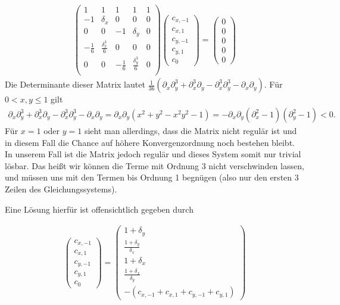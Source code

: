 \begin{solution}
  \begin{align*}
    \begin{pmatrix}
      1 & 1 & 1 & 1 & 1 \\
      -1 & \delta_x & 0 & 0 & 0 \\
      0 & 0 & -1 & \delta_y & 0 \\
      -\frac{1}{6} & \frac{\delta_x^3}{6} & 0 & 0 & 0 \\
      0 & 0 & -\frac{1}{6} & \frac{\delta_y^3}{6} & 0 \\
    \end{pmatrix}
    \begin{pmatrix}
      c_{x,-1} \\
      c_{x,1} \\
      c_{y,-1} \\
      c_{y,1} \\
      c_{0}
    \end{pmatrix} =
    \begin{pmatrix}
      0 \\ 0 \\ 0 \\ 0 \\ 0
    \end{pmatrix}
  \end{align*}
  Die Determinante dieser Matrix lautet
  $\frac{1}{36}(\partial_x\partial_y^3 + \partial_x^3\partial_y
  - \partial_x^3\partial_y^3 - \partial_x\partial_y)$.
  Für $0 < x,y \leq 1$ gilt
  \begin{align*}
    \partial_x\partial_y^3 + \partial_x^3\partial_y
    - \partial_x^3\partial_y^3 - \partial_x\partial_y =
    \partial_x\partial_y(x^2 + y^2 - x^2y^2 - 1) =
    -\partial_x\partial_y(\partial_x^2 - 1)(\partial_y^2 - 1) < 0.
  \end{align*}
  Für $x = 1$ oder $y = 1$ sieht man allerdings, dass die Matrix nicht regulär
  ist und in diesem Fall die Chance auf höhere Konvergenzordnung noch bestehen bleibt.
  In unserem Fall ist die Matrix jedoch regulär und dieses System somit nur trivial lösbar.
  Das heißt wir können die Terme mit Ordnung 3 nicht verschwinden lassen, und müssen uns mit den Termen bis Ordnung 1 begnügen (also nur den ersten 3 Zeilen des Gleichungssystems).

  Eine Lösung hierfür ist offensichtlich gegeben durch

  \begin{align*}
  \begin{pmatrix}
  c_{x,-1} \\
  c_{x,1} \\
  c_{y,-1} \\
  c_{y,1} \\
  c_{0}
  \end{pmatrix} =
  \begin{pmatrix}
    1+\delta_y \\ \frac{1+\delta_y}{\delta_x} \\ 1+\delta_x \\ \frac{1+\delta_x}{\delta_y} \\ -(c_{x,-1}+ c_{x,1} + c_{y,-1} + c_{y,1})
  \end{pmatrix}
  \end{align*}


\end{solution}
